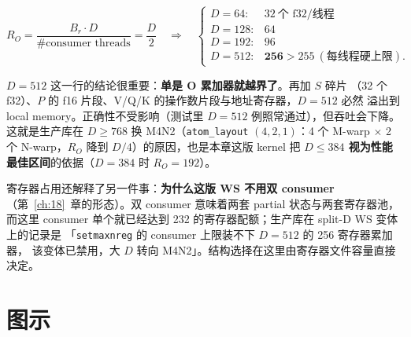 \begin{equation}
  R_O = \frac{B_r \cdot D}{\#\text{consumer threads}} = \frac{D}{2}
  \quad\Longrightarrow\quad
  \begin{cases}
    D = 64: & 32\ \text{个 f32/线程} \\
    D = 128: & 64 \\
    D = 192: & 96 \\
    D = 512: & \mathbf{256} > 255\ (\text{每线程硬上限}) .
  \end{cases}
  \label{eq:19-oacc}
\end{equation}

$D {=} 512$ 这一行的结论很重要：\textbf{单是 O 累加器就越界了}。再加 $S$ 碎片
（32 个 f32）、$P$ 的 f16 片段、V/Q/K 的操作数片段与地址寄存器，$D=512$ 必然
溢出到 local memory。正确性不受影响（测试里 $D{=}512$ 例照常通过），但吞吐会下降。
这就是生产库在 $D \ge 768$ 换 M4N2（\texttt{atom\_layout} $(4,2,1)$：4 个 M-warp
$\times$ 2 个 N-warp，$R_O$ 降到 $D/4$）的原因，也是本章这版 kernel 把
\textbf{$D \le 384$ 视为性能最佳区间}的依据（$D=384$ 时 $R_O = 192$）。

寄存器占用还解释了另一件事：\textbf{为什么这版 WS 不用双 consumer}
（第~\ref{ch:18}~章的形态）。双 consumer 意味着两套 partial 状态与两套寄存器池，
而这里 consumer 单个就已经达到 232 的寄存器配额；生产库在 split-D WS 变体上的记录是
「\texttt{setmaxnreg} 的 consumer 上限装不下 $D{=}512$ 的 256 寄存器累加器，
该变体已禁用，大 $D$ 转向 M4N2」。结构选择在这里由寄存器文件容量直接决定。

\needspace{117mm}

\section{图示}

